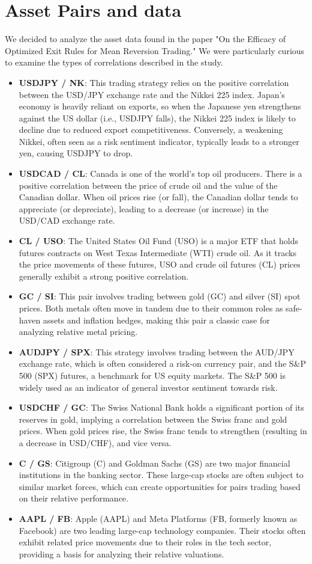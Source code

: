 \documentclass{article}
\begin{document}
\section*{Asset Pairs and data}
We decided to analyze the asset data found in the paper "On the Efficacy of Optimized Exit Rules for Mean Reversion Trading." We were particularly curious to examine the types of correlations described in the study.
\begin{itemize}
    \item \textbf{USDJPY / NK}: This trading strategy relies on the positive correlation between the USD/JPY exchange rate and the Nikkei 225 index. Japan's economy is heavily reliant on exports, so when the Japanese yen strengthens against the US dollar (i.e., USDJPY falls), the Nikkei 225 index is likely to decline due to reduced export competitiveness. Conversely, a weakening Nikkei, often seen as a risk sentiment indicator, typically leads to a stronger yen, causing USDJPY to drop.
    \item \textbf{USDCAD / CL}: Canada is one of the world's top oil producers. There is a positive correlation between the price of crude oil and the value of the Canadian dollar. When oil prices rise (or fall), the Canadian dollar tends to appreciate (or depreciate), leading to a decrease (or increase) in the USD/CAD exchange rate.
    \item \textbf{CL / USO}: The United States Oil Fund (USO) is a major ETF that holds futures contracts on West Texas Intermediate (WTI) crude oil. As it tracks the price movements of these futures, USO and crude oil futures (CL) prices generally exhibit a strong positive correlation.
    \item \textbf{GC / SI}: This pair involves trading between gold (GC) and silver (SI) spot prices. Both metals often move in tandem due to their common roles as safe-haven assets and inflation hedges, making this pair a classic case for analyzing relative metal pricing.
    \item \textbf{AUDJPY / SPX}: This strategy involves trading between the AUD/JPY exchange rate, which is often considered a risk-on currency pair, and the S\&P 500 (SPX) futures, a benchmark for US equity markets. The S\&P 500 is widely used as an indicator of general investor sentiment towards risk.
    \item \textbf{USDCHF / GC}: The Swiss National Bank holds a significant portion of its reserves in gold, implying a correlation between the Swiss franc and gold prices. When gold prices rise, the Swiss franc tends to strengthen (resulting in a decrease in USD/CHF), and vice versa.
    \item \textbf{C / GS}: Citigroup (C) and Goldman Sachs (GS) are two major financial institutions in the banking sector. These large-cap stocks are often subject to similar market forces, which can create opportunities for pairs trading based on their relative performance.
    \item \textbf{AAPL / FB}: Apple (AAPL) and Meta Platforms (FB, formerly known as Facebook) are two leading large-cap technology companies. Their stocks often exhibit related price movements due to their roles in the tech sector, providing a basis for analyzing their relative valuations.
\end{itemize}
\end{document}
